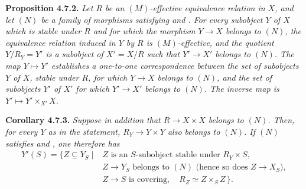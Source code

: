 \medskip
\noindent{}\textbf{Proposition 4.7.2.}
\textit{Let \(R\) be an \((M)\)-effective equivalence relation in \(X\), and
let \((N)\) be a family of morphisms satisfying  and
. For every subobject \(Y\) of \(X\) which is
stable under \(R\) and for which the morphism \(Y\to X\) belongs to \((N)\),
the equivalence relation induced in \(Y\) by \(R\) is \((M)\)-effective, and
the quotient \(Y/R_Y=Y'\) is a subobject of \(X'=X/R\) such that
\(Y'\to X'\) belongs to \((N)\). The map \(Y\mapsto Y'\) establishes a
one-to-one correspondence between the set of subobjects \(Y\) of \(X\),
stable under \(R\), for which \(Y\to X\) belongs to \((N)\), and the set of
subobjects \(Y'\) of \(X'\) for which \(Y'\to X'\) belongs to \((N)\). The
inverse map is \(Y'\mapsto Y'\times_{X'}X\).}

\medskip
\noindent{}\textbf{Corollary 4.7.3.}
\textit{Suppose in addition that \(R\to X\times X\) belongs to \((N)\).
Then, for every \(Y\) as in the statement, \(R_Y\to Y\times Y\) also
belongs to \((N)\). If \((N)\) satisfies  and
, one therefore has}
\[
\begin{aligned}
 Y'(S)=\{Z\subseteq Y_S\mid{}&
   Z\text{ is an }S\text{-subobject stable under }R_Y\times S,\\
 & Z\to Y_S\text{ belongs to }(N)
   \text{ (hence so does }Z\to X_S),\\
 & Z\to S\text{ is covering},\quad R_Z\simeq Z\times_S Z\,\}.
\end{aligned}
\]

